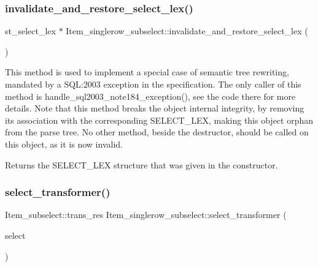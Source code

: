 \mbox{\label{classItem__singlerow__subselect_a7b7df4fb9a68f3f1cbdf629dca4f17cd}} 
\subsubsection{\texorpdfstring{invalidate\+\_\+and\+\_\+restore\+\_\+select\+\_\+lex()}{invalidate\_and\_restore\_select\_lex()}}
{\footnotesize\ttfamily st\+\_\+select\+\_\+lex $\ast$ Item\+\_\+singlerow\+\_\+subselect\+::invalidate\+\_\+and\+\_\+restore\+\_\+select\+\_\+lex (\begin{DoxyParamCaption}{ }\end{DoxyParamCaption})}

This method is used to implement a special case of semantic tree rewriting, mandated by a S\+QL\+:2003 exception in the specification. The only caller of this method is handle\+\_\+sql2003\+\_\+note184\+\_\+exception(), see the code there for more details. Note that this method breaks the object internal integrity, by removing it\textquotesingle{}s association with the corresponding S\+E\+L\+E\+C\+T\+\_\+\+L\+EX, making this object orphan from the parse tree. No other method, beside the destructor, should be called on this object, as it is now invalid. \begin{DoxyReturn}{Returns}
the S\+E\+L\+E\+C\+T\+\_\+\+L\+EX structure that was given in the constructor. 
\end{DoxyReturn}
\mbox{\label{classItem__singlerow__subselect_ad94e0b9d5a9d2d386405ef76c2bd0c69}} 
\subsubsection{\texorpdfstring{select\+\_\+transformer()}{select\_transformer()}}
{\footnotesize\ttfamily Item\+\_\+subselect\+::trans\+\_\+res Item\+\_\+singlerow\+\_\+subselect\+::select\+\_\+transformer (\begin{DoxyParamCaption}\item[{st\+\_\+select\+\_\+lex $\ast$}]{select }\end{DoxyParamCaption})\hspace{0.3cm}{\ttfamily [virtual]}}

